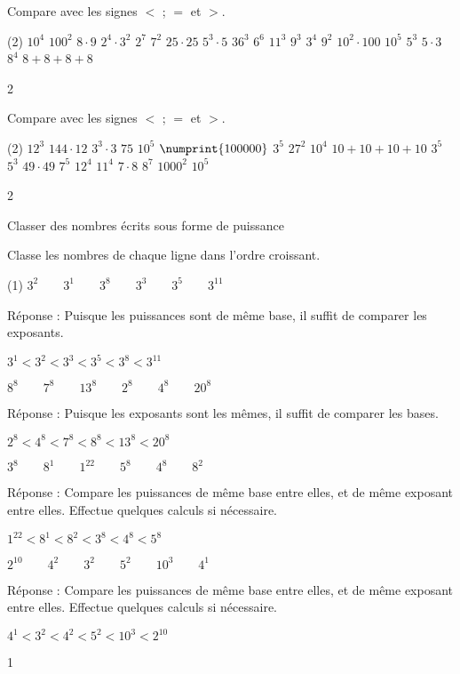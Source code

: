 \documentclass[a4paper,11pt]{report}
\begin{document}
\begin{exop}{%
Compare avec les signes $<$ ; $=$ et $>$.
\begin{tasks}(2)
    \task $10^4$  $100^2$
    \task $8\cdot9$  $2^4\cdot3^2$
    \task $2^7$  $7^2$
    \task $25\cdot25$  $5^3\cdot5$
    \task $36^3$  $6^6$
    \task $11^3$  $9^3$
    \task $3^4$  $9^2$
    \task $10^2\cdot100$  $10^5$
    \task $5^3$  $5\cdot3$
    \task $8^4$  $8+8+8+8$
\end{tasks}
}{2}    
\end{exop}

\begin{exop}{ %
Compare avec les signes $<$ ; $=$ et $>$.
\begin{tasks}(2)
    \task $12^3$  $144\cdot12$
    \task $3^3\cdot3$  $75$
    \task $10^5$  $\numprint{100000}$
    \task $3^5$  $27^2$
    \task $10^4$  $10+10+10+10$
    \task $3^5$  $5^3$
    \task $49\cdot49$  $7^5$
    \task $12^4$  $11^4$
    \task $7\cdot8$  $8^7$
    \task $1000^2$  $10^5$
\end{tasks}
}{2}    
\end{exop}

\begin{resolu}{Classer des nombres écrits sous forme de puissance}
{
Classe les nombres de chaque ligne dans l'ordre croissant.
\begin{tasks}(1)
    \task $3^2\qquad3^1\qquad3^8\qquad3^3\qquad3^5\qquad3^{11}$
    
    Réponse : Puisque les puissances sont de même base, il suffit de comparer les exposants.
    
    $3^1<3^2<3^3<3^5<3^8<3^{11} $
    
    \task $8^8\qquad7^8\qquad13^8\qquad2^8\qquad4^8\qquad20^8$

    Réponse : Puisque les exposants sont les mêmes, il suffit de comparer les bases.

    $2^8<4^8<7^8<8^8<13^8<20^8$
    
    \task $3^8\qquad8^1\qquad1^{22}\qquad5^8\qquad4^8\qquad8^2$

    Réponse : Compare les puissances de même base entre elles, et de même exposant entre elles. Effectue quelques calculs si nécessaire.

    $1^{22}<8^1<8^2<3^8<4^8<5^8$
    
    \task $2^{10}\qquad4^2\qquad3^2\qquad5^2\qquad10^3\qquad4^1$

    Réponse : Compare les puissances de même base entre elles, et de même exposant entre elles. Effectue quelques calculs si nécessaire.

    $4^1<3^2<4^2<5^2<10^3<2^{10}$
\end{tasks}

}{1}    
\end{resolu}
\end{document}

